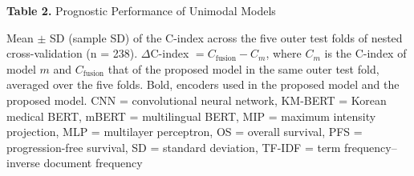 \documentclass[border=8pt]{standalone}
\newif\ifshowtitle \showtitletrue
\newif\ifshownotes \shownotestrue
\begin{document}
\sbox{}%
\begin{minipage}{\wd\tablebox}
\ifshowtitle\noindent \textbf{Table 2.} Prognostic Performance of Unimodal Models\par\vspace{4pt}\fi
\noindent\usebox\tablebox
\ifshownotes\par\vspace{3pt}\footnotesize\noindent Mean $\pm$ SD (sample SD) of the C-index across the five outer test folds of nested cross-validation (n = 238). $\Delta$C-index $= C_{\mathrm{fusion}} - C_{m}$, where $C_{m}$ is the C-index of model $m$ and $C_{\mathrm{fusion}}$ that of the proposed model in the same outer test fold, averaged over the five folds. Bold, encoders used in the proposed model and the proposed model. CNN = convolutional neural network, KM-BERT = Korean medical BERT, mBERT = multilingual BERT, MIP = maximum intensity projection, MLP = multilayer perceptron, OS = overall survival, PFS = progression-free survival, SD = standard deviation, TF-IDF = term frequency--inverse document frequency\par\fi
\end{minipage}
\end{document}
